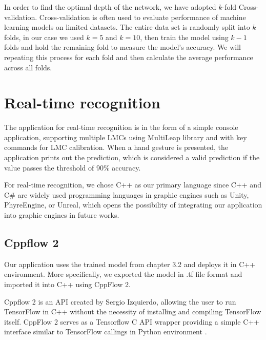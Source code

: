 In order to find the optimal depth of the network, we have adopted $k$-fold Cross-validation. Cross-validation is often used to evaluate performance of machine learning models on limited datasets. The entire data set is randomly split into $k$ folds, in our case we used $k=5$ and $k=10$, then train the model using $k-1$ folds and hold the remaining fold to measure the model's accuracy. We will repeating this process for each fold and then calculate the average performance across all folds.





\section{Real-time recognition}

The application for real-time recognition is in the form of a simple console application, supporting multiple LMCs using MultiLeap library and with key commands for LMC calibration. When a hand gesture is presented, the application prints out the prediction, which is considered a valid prediction if the value passes the threshold of 90\% accuracy.  

For real-time recognition, we chose C++ as our primary language since C++ and C\# are widely used programming languages in graphic engines such as Unity, PhyreEngine, or Unreal, which opens the possibility of integrating our application into graphic engines in future works.

\subsection{Cppflow 2}

Our application uses the trained model from chapter 3.2 and deploys it in C++ environment. More specifically, we exported the model in .tf file format and imported it into C++ using CppFlow 2.

Cppflow 2 is an API created by Sergio Izquierdo, allowing the user to run TensorFlow in C++ without the necessity of installing and compiling TensorFlow itself. CppFlow 2 serves as a Tensorflow C API wrapper providing a simple C++ interface similar to TensorFlow callings in Python environment \cite{cppflow}. 

